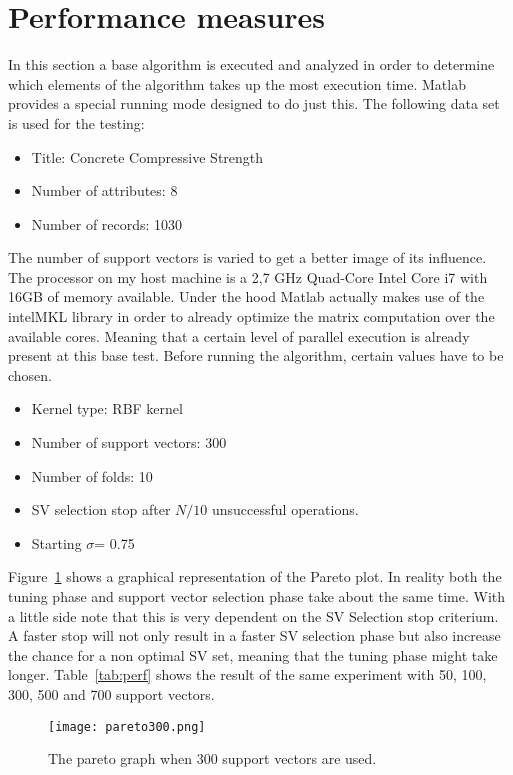 \section{Performance measures}
In this section a base algorithm is executed and analyzed in order to determine which elements of the algorithm takes up the most execution time.
Matlab provides a special running mode designed to do just this.
The following data set is used for the testing:
\begin{itemize}
	\item Title: Concrete Compressive Strength\cite{UCIMachi66:online}
	\item Number of attributes: 8
	\item Number of records: 1030
\end{itemize}
The number of support vectors is varied to get a better image of its influence.
The processor on my host machine is a 2,7 GHz Quad-Core Intel Core i7 with 16GB of memory available.
Under the hood Matlab actually makes use of the intelMKL library in order to already optimize the matrix computation over the available cores.
Meaning that a certain level of parallel execution is already present at this base test.
Before running the algorithm, certain values have to be chosen.
\begin{itemize}
	\item Kernel type: RBF kernel
	\item Number of support vectors: 300
	\item Number of folds: 10
	\item SV selection stop after $N/10$ unsuccessful operations.
	\item Starting $\sigma$= 0.75
\end{itemize}
Figure~\ref{fig:prato300} shows a graphical representation of the Pareto plot.
In reality both the tuning phase and support vector selection phase take about the same time. 
With a little side note that this is very dependent on the SV Selection stop criterium.
A faster stop will not only result in a faster SV selection phase but also increase the chance for a non optimal SV set, meaning that the tuning phase might take longer.
Table~\ref{tab:perf} shows the result of the same experiment with 50, 100, 300, 500 and 700 support vectors.
\begin{figure}
	\centering
	\texttt{[image: pareto300.png]}
	\caption{The pareto graph when 300 support vectors are used. }
	\label{fig:prato300}
\end{figure}
